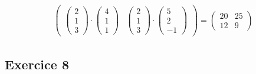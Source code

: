 \documentclass[12pt]{article}
\begin{document}
\begin{enumerate}
\begin{enumerate}
\begin{align*}
\begin{pmatrix}
                \begin{pmatrix}
                    2 \\
                    1 \\
                    3
                \end{pmatrix} \cdot
                \begin{pmatrix}
                    4 \\
                    1 \\
                    1
                \end{pmatrix} &
                \begin{pmatrix}
                    2 \\
                    1 \\
                    3
                \end{pmatrix} \cdot
                \begin{pmatrix}
                    5 \\
                    2 \\
                    -1
                \end{pmatrix}
            \end{pmatrix}
            = \begin{pmatrix}
                20 & 25 \\
                12 & 9
            \end{pmatrix}
        \end{align*}
    \end{enumerate}
\end{enumerate}

\subsection*{Exercice 8}
\end{document}

